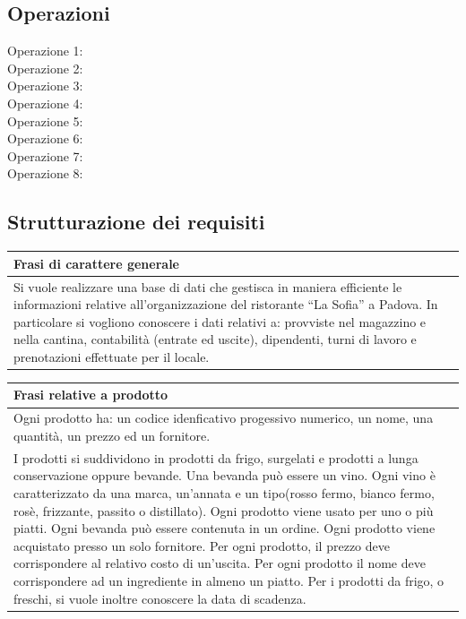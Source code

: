 \subsection{Operazioni} %
\begin{description}
    \item [Operazione 1:]
    \item [Operazione 2:]
    \item [Operazione 3:]
    \item [Operazione 4:]
    \item [Operazione 5:]
    \item [Operazione 6:]
    \item [Operazione 7:]
    \item [Operazione 8:]
\end{description}

\subsection{Strutturazione dei requisiti} 
\begin{longtable}{|p{15.5cm}|}
    \hline
    \textbf{Frasi di carattere generale} \\ \hline
    Si vuole realizzare una base di dati che gestisca in maniera efficiente le informazioni relative all’organizzazione del ristorante “La Sofia” a Padova. In particolare si vogliono conoscere i dati relativi a: provviste nel magazzino e nella cantina, contabilità (entrate ed uscite), dipendenti, turni di lavoro e prenotazioni effettuate per il locale. \\ \hline
\end{longtable}

\begin{longtable}{|p{15.5cm}|}
    \hline
    \textbf{Frasi relative a prodotto} \\ \hline
    Ogni prodotto ha: un codice idenficativo progessivo numerico, un nome, una quantità, un prezzo ed un fornitore.\\
    I prodotti si suddividono in prodotti da frigo, surgelati e prodotti a lunga conservazione
oppure bevande.
Una bevanda può essere un vino.
Ogni vino è caratterizzato da una marca, un’annata e un tipo(rosso fermo, bianco
fermo, rosè, frizzante, passito o distillato).
Ogni prodotto viene usato per uno o più piatti.
Ogni bevanda può essere contenuta in un ordine.
Ogni prodotto viene acquistato presso un solo fornitore.
Per ogni prodotto, il prezzo deve corrispondere al relativo costo di un’uscita.
Per ogni prodotto il nome deve corrispondere ad un ingrediente in almeno un piatto.
Per i prodotti da frigo, o freschi, si vuole inoltre conoscere la data di scadenza.\\ \hline
\end{longtable}

